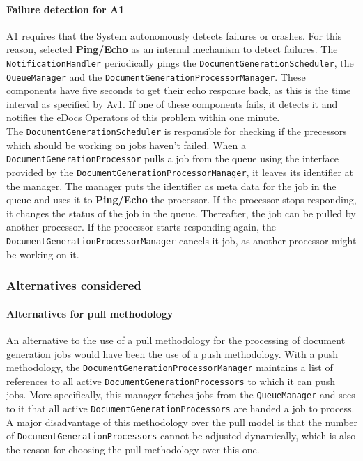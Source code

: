\documentclass[a4paper,10pt]{article}
\begin{document}
\paragraph{Failure detection for A1}
A1 requires that the System autonomously detects failures or crashes. For this reason, selected \textbf{Ping/Echo} as an internal mechanism to detect failures. The \texttt{NotificationHandler} periodically pings the \texttt{DocumentGenerationScheduler}, the \texttt{QueueManager} and the \texttt{DocumentGenerationProcessorManager}. These components have five seconds to get their echo response back, as this is the time interval as specified by Av1. If one of these components fails, it detects it and notifies the eDocs Operators of this problem within one minute.\\
The \texttt{DocumentGenerationScheduler} is responsible for checking if the precessors which should be working on jobs haven't failed. When a \texttt{DocumentGenerationProcessor} pulls a job from the queue using the interface provided by the \texttt{DocumentGenerationProcessorManager}, it leaves its identifier at the manager. The manager puts the identifier as meta data for the job in the queue and uses it to \textbf{Ping/Echo} the processor. If the processor stops responding, it changes the status of the job in the queue. Thereafter, the job can be pulled by another processor. If the processor starts responding again, the \texttt{DocumentGenerationProcessorManager} cancels it job, as another processor might be working on it.

\subsubsection*{Alternatives considered}
\paragraph{Alternatives for pull methodology}
An alternative to the use of a pull methodology for the processing of document generation jobs would have been the use of a push methodology. With a push methodology, the \texttt{DocumentGenerationProcessorManager} maintains a list of references to all active \texttt{DocumentGenerationProcessors} to which it can push jobs. More specifically, this manager fetches jobs from the \texttt{QueueManager} and sees to it that all active \texttt{DocumentGenerationProcessors} are handed a job to process. A major disadvantage of this methodology over the pull model is that the number of \texttt{DocumentGenerationProcessors} cannot be adjusted dynamically, which is also the reason for choosing the pull methodology over this one.
\end{document}
